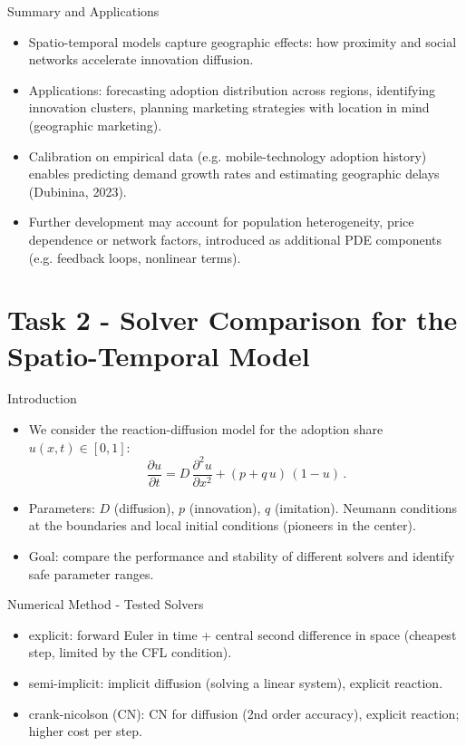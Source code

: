 \documentclass[9pt]{beamer}
\begin{document}
\begin{frame}{Summary and Applications}
\begin{itemize}
    \item Spatio-temporal models capture geographic effects: how proximity and social networks accelerate innovation diffusion.
  \item Applications: forecasting adoption distribution across regions, identifying innovation clusters, planning marketing strategies with location in mind (geographic marketing).
    \item Calibration on empirical data (e.g. mobile-technology adoption history) enables predicting demand growth rates and estimating geographic delays (Dubinina, 2023).
    \item Further development may account for population heterogeneity, price dependence or network factors, introduced as additional PDE components (e.g. feedback loops, nonlinear terms).
\end{itemize}
\end{frame}

\section*{Task 2 - Solver Comparison for the Spatio-Temporal Model}

\begin{frame}{Introduction}
\begin{itemize}
  \item We consider the reaction-diffusion model for the adoption share $u(x,t)\in[0,1]$:
  $$\frac{\partial u}{\partial t} = D\,\frac{\partial^2 u}{\partial x^2} + (p + q\,u)\,(1-u)\,. $$
  \item Parameters: $D$ (diffusion), $p$ (innovation), $q$ (imitation). Neumann conditions at the boundaries and local initial conditions (pioneers in the center).
  \item Goal: compare the performance and stability of different solvers and identify safe parameter ranges.
\end{itemize}
\end{frame}

\begin{frame}{Numerical Method - Tested Solvers}
\begin{itemize}
  \item explicit: forward Euler in time + central second difference in space (cheapest step, limited by the CFL condition).
  \item semi-implicit: implicit diffusion (solving a linear system), explicit reaction.
  \item crank-nicolson (CN): CN for diffusion (2nd order accuracy), explicit reaction; higher cost per step.
\end{itemize}
\end{frame}
\end{document}
